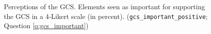 \begin{figure}[h!]
    \cprotect\caption[Perceptions of the GCS]{Perceptions of the GCS. Elements seen as important for supporting the GCS in a 4-Likert scale (in percent). (\verb|gcs_important_positive|; Question \ref{q:gcs_important})  %
    }\label{fig:gcs_important}
\end{figure}

